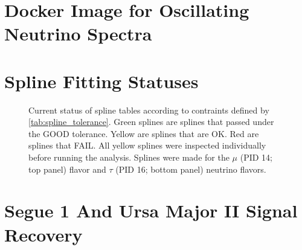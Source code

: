 \section{Docker Image for Oscillating Neutrino Spectra}\label{sec:apdx_nu_spec}


\clearpage

\section{Spline Fitting Statuses} \label{sec:apdx_nu_splines}

\begin{figure}[ht]
    \caption{Current status of spline tables according to contraints defined by \cref{tab:spline_tolerance}. Green splines are splines that passed under the GOOD tolerance. Yellow are splines that are OK. Red are splines that FAIL. All yellow splines were inspected individually before running the analysis. Splines were made for the $\mu$ (PID 14; top panel) flavor and $\tau$ (PID 16; bottom panel) neutrino flavors.}
    \label{fig:apdx_nu_splines}
\end{figure}

\clearpage
\section{Segue 1 And Ursa Major II Signal Recovery} \label{sec:apdx_TS_per_src}
